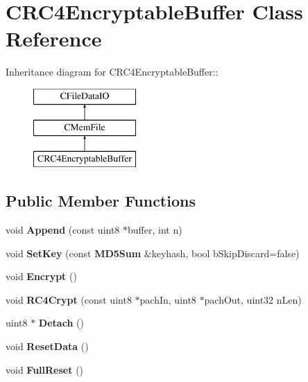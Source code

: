 \section{CRC4EncryptableBuffer Class Reference}
\label{classCRC4EncryptableBuffer}
Inheritance diagram for CRC4EncryptableBuffer::\begin{figure}[H]
\begin{center}
\leavevmode
\includegraphics[height=3cm]{classCRC4EncryptableBuffer}
\end{center}
\end{figure}
\subsection*{Public Member Functions}
\begin{DoxyCompactItemize}
\item 
void {\bfseries Append} (const uint8 $\ast$buffer, int n)\label{classCRC4EncryptableBuffer_a0ff982c03234c0e2e79f88d20fb601e2}

\item 
void {\bfseries SetKey} (const {\bf MD5Sum} \&keyhash, bool bSkipDiscard=false)\label{classCRC4EncryptableBuffer_a2d825f68c96916a7f36434115137e187}

\item 
void {\bfseries Encrypt} ()\label{classCRC4EncryptableBuffer_ab1b688256228565229498081eee4ba64}

\item 
void {\bfseries RC4Crypt} (const uint8 $\ast$pachIn, uint8 $\ast$pachOut, uint32 nLen)\label{classCRC4EncryptableBuffer_a8f818cfc6f2e407c6b62211807953813}

\item 
uint8 $\ast$ {\bfseries Detach} ()\label{classCRC4EncryptableBuffer_aa0eb688f20306f3d19fcd8fcf9bdad52}

\item 
void {\bf ResetData} ()\label{classCRC4EncryptableBuffer_a832167698e85ea5afe4e8e990fdd75a2}

\item 
void {\bfseries FullReset} ()\label{classCRC4EncryptableBuffer_a25191a7724abb30e6a94355215db158b}

\end{DoxyCompactItemize}

